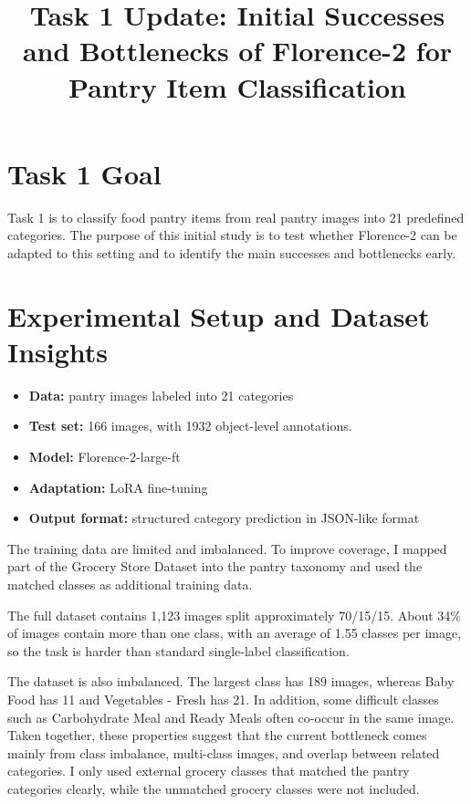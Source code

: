 \documentclass[11pt]{article}
\title{Task 1 Update: Initial Successes and Bottlenecks of Florence-2 for Pantry Item Classification}
\author{}
\date{}
\begin{document}
\maketitle

\section{Task 1 Goal}

Task 1 is to classify food pantry items from real pantry images into 21 predefined categories. The purpose of this initial study is to test whether Florence-2 can be adapted to this setting and to identify the main successes and bottlenecks early.

\section{Experimental Setup and Dataset Insights}

\begin{itemize}[nosep,leftmargin=1.5em]
 \item \textbf{Data:} pantry images labeled into 21 categories
 \item \textbf{Test set:} 166 images, with 1932 object-level annotations.
 \item \textbf{Model:} Florence-2-large-ft
 \item \textbf{Adaptation:} LoRA fine-tuning
 \item \textbf{Output format:} structured category prediction in JSON-like format
\end{itemize}

The training data are limited and imbalanced. To improve coverage, I mapped part of the Grocery Store Dataset \cite{klasson2019grocery} into the pantry taxonomy and used the matched classes as additional training data.

The full dataset contains 1,123 images split approximately 70/15/15. About 34\% of images contain more than one class, with an average of 1.55 classes per image, so the task is harder than standard single-label classification.

The dataset is also imbalanced. The largest class has 189 images, whereas Baby Food has 11 and Vegetables - Fresh has 21. In addition, some difficult classes such as Carbohydrate Meal and Ready Meals often co-occur in the same image. Taken together, these properties suggest that the current bottleneck comes mainly from class imbalance, multi-class images, and overlap between related categories. I only used external grocery classes that matched the pantry categories clearly, while the unmatched grocery classes were not included.
\end{document}
